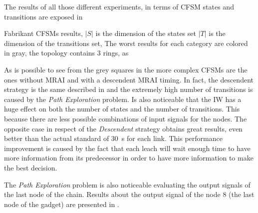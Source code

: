 The results of all those different experiments, in terms of \ac{CFSM} states and
transitions are exposed in 

\begin{table}[h]
	
	\caption{Fabrikant \ac{CFSM}s results, $|S|$ is the dimension of the states set
		$|T|$ is the dimension of the transitions set, The worst results for each
		category are colored in gray, the topology contains \num{3} rings, as
		}
	\label{tbl:fabrikant_cfsm}
\end{table}

As is possible to see from the grey squares in  the more
complex \ac{CFSM}s are the ones without \ac{MRAI} and with a descendent \ac{MRAI}
timing.
In fact, the descendent strategy is the same described in \cite{fabrikant2011there}
and the extremely high number of transitions is caused by the \textit{Path Exploration}
problem.
Is also noticeable that the \ac{IW} has a huge effect on both the number
of states and the number of transitions.
This because there are less possible combinations of input signals for the nodes.
The opposite case in respect of the \textit{Descendent} strategy obtains
great results, even better than the actual standard of \SI{30}{\second} for
each link.
This performance improvement is caused by the fact that each leach will wait
enough time to have more information from its predecessor in order to have
more information to make the best decision.

The \textit{Path Exploration} problem is also noticeable evaluating the
output signals of the last node of the chain.
Results about the output signal of the node \num{8} (the last node of the gadget)
are presented in .

